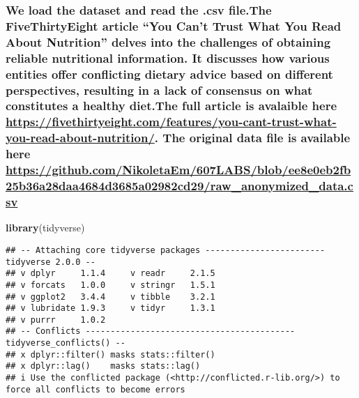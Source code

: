 \documentclass[
]{article}
\newenvironment{Shaded}{\begin{snugshade}}{\end{snugshade}}
\newcommand{\FunctionTok}[1]{\textcolor[rgb]{0.13,0.29,0.53}{\textbf{#1}}}
\newcommand{\NormalTok}[1]{#1}
\begin{document}
{\subsubsection{\texorpdfstring{We load the dataset and read the .csv
file.The FiveThirtyEight article ``You Can't Trust What You Read About
Nutrition'' delves into the challenges of obtaining reliable nutritional
information. It discusses how various entities offer conflicting dietary
advice based on different perspectives, resulting in a lack of consensus
on what constitutes a healthy diet.The full article is avalaible here
\url{https://fivethirtyeight.com/features/you-cant-trust-what-you-read-about-nutrition/}.
The original data file is available here
\url{https://github.com/NikoletaEm/607LABS/blob/ee8e0eb2fb25b36a28daa4684d3685a02982cd29/raw_anonymized_data.csv}}{We load the dataset and read the .csv file.The FiveThirtyEight article ``You Can't Trust What You Read About Nutrition'' delves into the challenges of obtaining reliable nutritional information. It discusses how various entities offer conflicting dietary advice based on different perspectives, resulting in a lack of consensus on what constitutes a healthy diet.The full article is avalaible here https://fivethirtyeight.com/features/you-cant-trust-what-you-read-about-nutrition/. The original data file is available here https://github.com/NikoletaEm/607LABS/blob/ee8e0eb2fb25b36a28daa4684d3685a02982cd29/raw\_anonymized\_data.csv}}\label{we-load-the-dataset-and-read-the-.csv-file.the-fivethirtyeight-article-you-cant-trust-what-you-read-about-nutrition-delves-into-the-challenges-of-obtaining-reliable-nutritional-information.-it-discusses-how-various-entities-offer-conflicting-dietary-advice-based-on-different-perspectives-resulting-in-a-lack-of-consensus-on-what-constitutes-a-healthy-diet.the-full-article-is-avalaible-here-httpsfivethirtyeight.comfeaturesyou-cant-trust-what-you-read-about-nutrition.-the-original-data-file-is-available-here-httpsgithub.comnikoletaem607labsblobee8e0eb2fb25b36a28daa4684d3685a02982cd29raw_anonymized_data.csv}}

\begin{Shaded}
\begin{Highlighting}[]
\FunctionTok{library}\NormalTok{(tidyverse)}
\end{Highlighting}
\end{Shaded}

\begin{verbatim}
## -- Attaching core tidyverse packages ------------------------ tidyverse 2.0.0 --
## v dplyr     1.1.4     v readr     2.1.5
## v forcats   1.0.0     v stringr   1.5.1
## v ggplot2   3.4.4     v tibble    3.2.1
## v lubridate 1.9.3     v tidyr     1.3.1
## v purrr     1.0.2     
## -- Conflicts ------------------------------------------ tidyverse_conflicts() --
## x dplyr::filter() masks stats::filter()
## x dplyr::lag()    masks stats::lag()
## i Use the conflicted package (<http://conflicted.r-lib.org/>) to force all conflicts to become errors
\end{verbatim}
\end{document}
